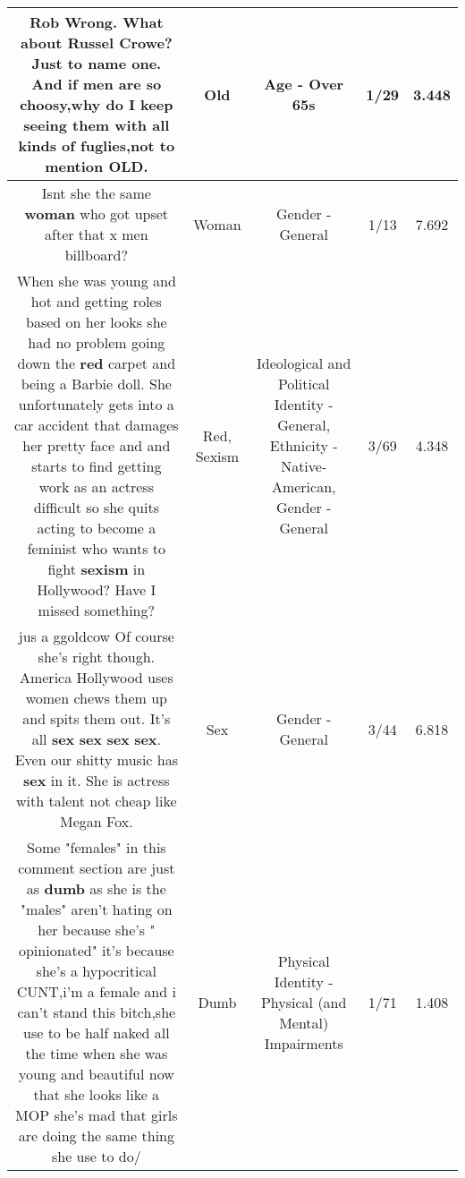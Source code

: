 \documentclass[11pt]{article}
\newlength\mylength
\begin{document}
\begin{center}
\begin{longtable}{|C{.65\mylength}|C{.30\mylength}|C{.12\mylength}|C{.12\mylength}|C{.12\mylength}|}
  \small Rob Wrong. What about Russel Crowe? Just to name one. And if men are so choosy,why do I keep seeing them with all kinds of fuglies,not to mention \textbf{OLD}.\normalsize   & Old & Age - Over 65s & 1/29 & 3.448 \\  \hline
  \small Isnt she the same \textbf{woman} who got upset after that x men billboard?\normalsize   & Woman & Gender - General & 1/13 & 7.692 \\  \hline
  \small When she was young and hot and getting roles based on her looks she had no problem going down the \textbf{r\textbf{ed}} carpet and being a Barbie doll. She unfortunately gets into a car accident that damages her pretty face and and starts to find getting work as an actress difficult so she quits acting to become a feminist who wants to fight \textbf{sexism} in Hollywood? Have I missed something?\normalsize   & Red, Sexism &  Ideological and Political Identity - General, Ethnicity - Native-American, Gender - General & 3/69 & 4.348 \\  \hline
  \small jus a ggoldcow Of course she's right though.  America  Hollywood uses women chews them up and spits them out.  It's all \textbf{sex} \textbf{sex} \textbf{sex} \textbf{sex}.  Even our shitty music has \textbf{sex} in it.  She is actress with talent not cheap like Megan Fox.\normalsize   & Sex & Gender - General & 3/44 & 6.818 \\  \hline
  \small Some "females" in this comment section are just as \textbf{dumb} as she is the "males" aren't hating on her because she's " opinionated" it's because she's a hypocritical CUNT,i'm a female and i can't stand this bitch,she use to be half naked all the time when she was young  and beautiful now that she looks like a MOP she's mad that girls are doing the same thing she use to do/\normalsize   & Dumb & Physical Identity - Physical (and Mental) Impairments & 1/71 & 1.408 \\  \hline

\end{longtable}
\end{center}
\end{document}
